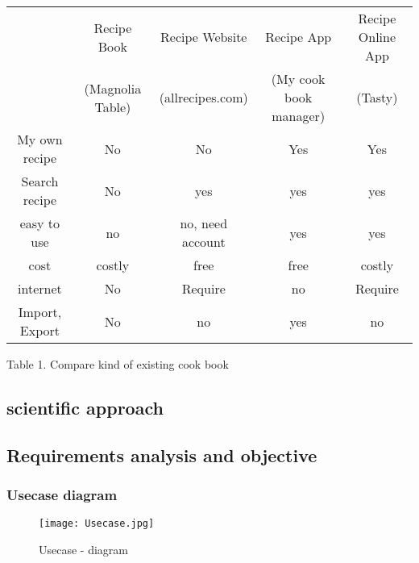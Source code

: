 \documentclass{article}
\begin{document}
\begin{center}
 \begin{tabular}{||c c c c c||} 
 \hline
  & Recipe Book & Recipe Website & Recipe App & Recipe Online App \\ [0.5ex] 
  & (Magnolia Table) & (allrecipes.com) & (My cook book manager) & (Tasty) \\ [0.5ex] 
 \hline\hline
My own recipe & No & No & Yes & Yes \\ 
 \hline
 Search recipe & No & yes & yes & yes \\
 \hline
 easy to use & no & no, need account & yes & yes \\
 \hline
 cost & costly & free & free &  costly\\
 \hline
 internet & No & Require & no & Require \\ [1ex] 
 \hline
  Import, Export & No & no & yes & no \\ [1ex] 
 \hline
\end{tabular}
\caption{Table 1.  Compare kind of existing cook book}
\end{center}

\subsection{scientific approach}

\subsection{ Requirements analysis and objective}
\subsubsection{ Usecase diagram}

\begin{figure}[h!]
\centering
\texttt{[image: Usecase.jpg]}
\caption{Usecase - diagram}
\label{fig:Usecase}
\end{figure}
\end{document}
